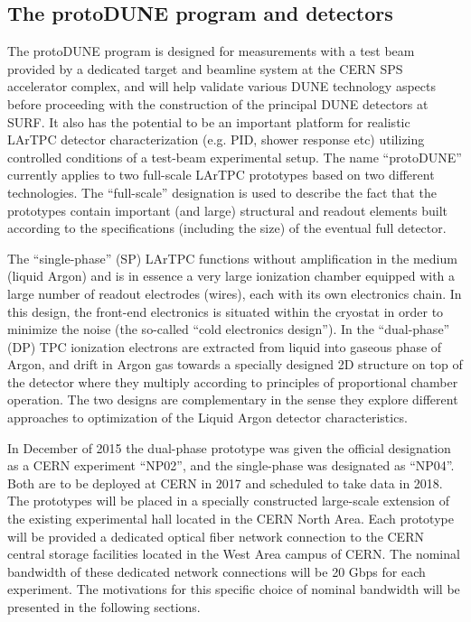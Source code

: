 
\subsection{The protoDUNE program and detectors}
The protoDUNE program is designed for measurements with a test beam provided by a dedicated target and beamline system at the CERN SPS accelerator complex, and will help validate various DUNE technology aspects before proceeding with the construction of the principal DUNE detectors at SURF. It also has the potential to be an important platform for realistic LArTPC detector characterization (e.g. PID, shower response etc) utilizing controlled conditions of a test-beam experimental setup. The name ``protoDUNE'' currently applies to two full-scale LArTPC prototypes based on two different technologies. The ``full-scale'' designation is used to describe the fact that the prototypes contain important (and large) structural and readout elements built according to the specifications (including the size) of the eventual full detector.

The  ``single-phase'' (SP) LArTPC functions without amplification in the medium (liquid Argon) and is in essence a very large ionization chamber equipped with a large number of readout electrodes (wires), each with its own electronics chain. In this design, the front-end electronics is situated within the cryostat in order to minimize the noise (the so-called ``cold electronics design''). In the ``dual-phase'' (DP) TPC ionization electrons are extracted from liquid into gaseous phase of Argon, and drift in Argon gas towards a specially designed 2D structure on top of the detector where they multiply according to principles of proportional chamber operation. The two designs are complementary in the sense they explore different approaches to optimization of the Liquid Argon detector characteristics.

In December of 2015 the dual-phase prototype was given the official designation as a CERN experiment ``NP02'', and the single-phase was designated as ``NP04''. Both are to be deployed at CERN in 2017 and scheduled to take data in 2018. The prototypes will be placed in a specially constructed large-scale extension of the existing experimental hall located in the CERN North Area. Each prototype will be provided a dedicated optical fiber network connection to the CERN central storage facilities located in the West Area campus of CERN. The nominal bandwidth of these dedicated network connections will be 20 Gbps for each experiment. The motivations for this specific choice of nominal bandwidth will be presented in the following sections.

